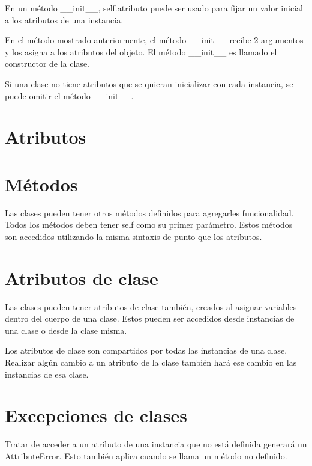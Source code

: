 \documentclass{report}
\begin{document}

En un método \_\_init\_\_, self.atributo puede ser usado para fijar un valor inicial a los atributos de una instancia.

En el método mostrado anteriormente, el método \_\_init\_\_ recibe 2 argumentos y los asigna a los atributos del objeto. El método \_\_init\_\_ es llamado el constructor de la clase.

Si una clase no tiene atributos que se quieran inicializar con cada instancia, se puede omitir el método \_\_init\_\_.



\section{Atributos}

\section{Métodos}

Las clases pueden tener otros métodos definidos para agregarles funcionalidad. Todos los métodos deben tener self como su primer parámetro.
Estos métodos son accedidos utilizando la misma sintaxis de punto que los atributos.


\section{Atributos de clase}

Las clases pueden tener atributos de clase también, creados al asignar variables dentro del cuerpo de una clase. Estos pueden ser accedidos desde instancias de una clase o desde la clase misma.


Los atributos de clase son compartidos por todas las instancias de una clase. Realizar algún cambio a un atributo de la clase también hará ese cambio en las instancias de esa clase.


\section{Excepciones de clases}

Tratar de acceder a un atributo de una instancia que no está definida generará un AttributeError. Esto también aplica cuando se llama un método no definido.
\end{document}
